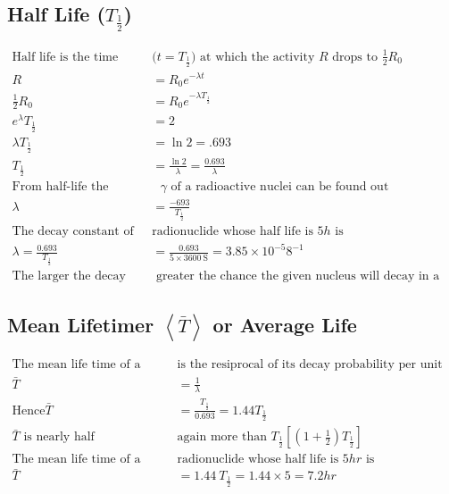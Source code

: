 \subsection{Half Life ($T_\frac{1}{2}$)}
\begin{align*}
\text{Half life is the time }&\text{($t=T_\frac{1}{2}$) at which the activity $R$ drops to $\frac{1}{2}R_0$}\\
R&=R_{0} e^{-\lambda t}\\
\frac{1}{2} R_{0}&=R _0 e^{-\lambda T_\frac{1}{2}}\\
e^\lambda T_\frac{1}{2}&=2\\
\lambda T_\frac{1}{2}&=\ln 2=.693\\
T_\frac{1}{2}&=\frac{\ln 2}{\lambda}=\frac{0.693}{\lambda}\\
\text{From half-life the decay constant}&\text{ $\gamma$ of a radioactive nuclei can be found out }\\
\lambda&=\frac{-693}{T_\frac{1}{2}}\\
\text{The decay constant of }&\text{radionuclide whose half life is $5 h$ is}\\
\lambda=\frac{0.693}{T _\frac{1}{2}}&=\frac{0.693}{5 \times 3600 \mathrm{~S}}=3.85 \times 10^{-5} 8^{-1}\\
\text{The larger the decay constant, the}&\text{ greater the chance the given nucleus will decay in a certain period of time}
\end{align*}
\subsection{Mean Lifetimer $\left\langle \bar{T}\right\rangle $ or Average Life }
\begin{align*}
\text{The mean life time of a nuclide }&\text{is the resiprocal of its decay probability per unit time.}\\
\bar{T}&=\frac{1}{\lambda}\\
\text{Hence}
\bar{T}&=\frac{T_\frac{1}{2}}{0.693}=1.44 T_\frac{1}{2}\\
\text{$\bar{T}$ is nearly half }&\text{again more than $T_{\frac{1}{2}}\left[\left(1+\frac{1}{2}\right) T_\frac{1}{2}\right]$}\\
\text{The mean life time of a }&\text{radionuclide whose half life is $5 hr$ is}\\
\bar{T}&=1.44 \ T_{\frac{1}{2}}=1.44 \times 5=7.2 hr
\end{align*}
